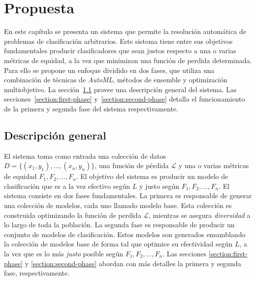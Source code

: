 \chapter{Propuesta}\label{chapter:proposal}

En este capítulo se presenta un sistema que permite la resolución automática de problemas de clasificación arbitrarios.
Este sistema tiene entre sus objetivos fundamentales producir clasificadores que sean justos respecto a una o varias métricas de equidad, a la vez que minimizan una función de perdida determinada.
Para ello se propone un enfoque dividido en dos fases, que utiliza una combinación de técnicas de \emph{AutoML}, métodos de ensemble y optimización multiobjetivo.
La sección~\ref{section:overview} provee una descripción general del sistema.
Las secciones~\ref{section:first-phase} y~\ref{section:second-phase} detalla el funcionamiento de la primera y segunda fase del sistema respectivamente.

\section{Descripción general}\label{section:overview}

El sistema toma como entrada una colección de datos $D = \{(x_1, y_1), \dots , (x_n, y_n)\}$, una función de pérdida $\mathcal{L}$ y una o varias métricas de equidad $F_1, F_2, \dots, F_n$.
El objetivo del sistema es producir un modelo de clasificación que es a la vez efectivo según $L$ y justo según $F_1, F_2, \dots, F_n$.
El sistema consiste en dos fases fundamentales.
La primera es responsable de generar una colección de modelos, cada uno llamado modelo base.
Esta colección es construida optimizando la función de perdida $\mathcal{L}$, mientras se asegura \emph{diversidad} a lo largo de toda la población.
La segunda fase es responsable de producir un conjunto de modelos de clasificación.
Estos modelos son generados ensamblando la colección de modelos base de forma tal que optimice su efectividad según $L$, a la vez que es lo más \emph{justo} posible según $F_1, F_2, \dots, F_n$.
Las secciones \ref{section:first-phase} y \ref{section:second-phase} abordan con más detalles la primera y segunda fase, respectivamente.



